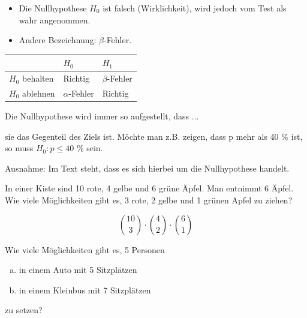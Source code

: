 \documentclass[paper=a6,ngerman,twoside=true,fontsize=14pt, parskip = half]{scrartcl}
\begin{document}
\begin{antwort}
	\begin{itemize}
		\item Die Nullhypothese $H_0$ ist falsch (Wirklichkeit), wird jedoch vom Test als wahr angenommen.
		\item Andere Bezeichnung: $\beta$-Fehler.	
	\end{itemize}
	\begin{center}
		\begin{tabularx}{\textwidth}{|>{\centering\arraybackslash}X|>{\centering\arraybackslash}X|>{\centering\arraybackslash}X|}
			\hline
			\diagbox{Test}{Wirkl.} & $H_0$ & $H_1$ \\ \hline
			$H_0$ behalten & Richtig & $\beta$-Fehler \\ \hline
			$H_0$ ablehnen & $\alpha$-Fehler & Richtig \\ \hline
		\end{tabularx}
	\end{center}
\end{antwort}	
\begin{frage}
	Die Nullhypothese wird immer so aufgestellt, dass ...
	
\end{frage}
\begin{antwort}
	sie das Gegenteil des Ziels ist. Möchte man z.B. zeigen, dass p mehr als 40 $\%$ ist,
	so muss $H_0: p \le 40$ $\%$ sein.
	
	Ausnahme: Im Text steht, dass es sich hierbei um die Nullhypothese handelt.
\end{antwort}	
\begin{frage}
	In einer Kiste sind 10 rote, 4 gelbe und 6 grüne Äpfel. Man entnimmt 6 Äpfel. Wie viele Möglichkeiten gibt es, 3 rote, 2 gelbe und 1 grünen Apfel zu ziehen? 
	
\end{frage}
\begin{antwort}
	\[\binom{10}{3} \cdot \binom{4}{2} \cdot \binom{6}{1}\]
\end{antwort}	
\begin{frage}
	Wie viele Möglichkeiten gibt es, 5 Personen 
	\normalsize
	\begin{enumerate}[(a)]
		\item in einem Auto mit 5 Sitzplätzen
		\item in einem Kleinbus mit 7 Sitzplätzen 
	\end{enumerate}
	\large
	zu setzen?
	
\end{frage}
\end{document}
